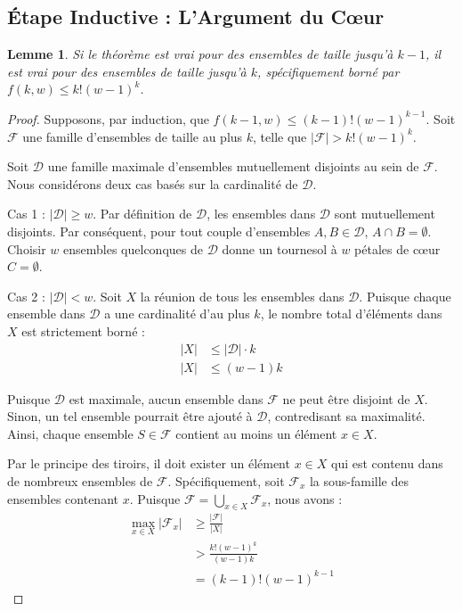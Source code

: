 \documentclass[12pt,a4paper]{article}
\newtheorem{lemma}[theorem]{Lemme}
\begin{document}
\subsection{\'Etape Inductive : L'Argument du C{\oe}ur}
\begin{lemma} \label{lem:inductive_step}
Si le th\'eor\`eme est vrai pour des ensembles de taille jusqu'\`a $k-1$, il est vrai pour des ensembles de taille jusqu'\`a $k$, sp\'ecifiquement born\'e par $f(k, w) \le k!(w-1)^k$.
\end{lemma}
\begin{proof}
Supposons, par induction, que $f(k-1, w) \le (k-1)!(w-1)^{k-1}$. Soit $\mathcal{F}$ une famille d'ensembles de taille au plus $k$, telle que $|\mathcal{F}| > k!(w-1)^k$.

Soit $\mathcal{D}$ une famille maximale d'ensembles mutuellement disjoints au sein de $\mathcal{F}$. Nous consid\'erons deux cas bas\'es sur la cardinalit\'e de $\mathcal{D}$.

Cas 1 : $|\mathcal{D}| \ge w$.
Par d\'efinition de $\mathcal{D}$, les ensembles dans $\mathcal{D}$ sont mutuellement disjoints. Par cons\'equent, pour tout couple d'ensembles $A, B \in \mathcal{D}$, $A \cap B = \emptyset$. Choisir $w$ ensembles quelconques de $\mathcal{D}$ donne un tournesol \`a $w$ p\'etales de c{\oe}ur $C = \emptyset$.

Cas 2 : $|\mathcal{D}| < w$.
Soit $X$ la r\'eunion de tous les ensembles dans $\mathcal{D}$. Puisque chaque ensemble dans $\mathcal{D}$ a une cardinalit\'e d'au plus $k$, le nombre total d'\'el\'ements dans $X$ est strictement born\'e :
\begin{align}
|X| &\le |\mathcal{D}| \cdot k \nonumber \\
|X| &\le (w - 1)k \label{eq:bound_x}
\end{align}

Puisque $\mathcal{D}$ est maximale, aucun ensemble dans $\mathcal{F}$ ne peut \^etre disjoint de $X$. Sinon, un tel ensemble pourrait \^etre ajout\'e \`a $\mathcal{D}$, contredisant sa maximalit\'e. Ainsi, chaque ensemble $S \in \mathcal{F}$ contient au moins un \'el\'ement $x \in X$.

Par le principe des tiroirs, il doit exister un \'el\'ement $x \in X$ qui est contenu dans de nombreux ensembles de $\mathcal{F}$. Sp\'ecifiquement, soit $\mathcal{F}_x$ la sous-famille des ensembles contenant $x$. Puisque $\mathcal{F} = \bigcup_{x \in X} \mathcal{F}_x$, nous avons :
\begin{align}
\max_{x \in X} |\mathcal{F}_x| &\ge \frac{|\mathcal{F}|}{|X|} \nonumber \\
&> \frac{k!(w-1)^k}{(w-1)k} \nonumber \\
&= (k-1)!(w-1)^{k-1}
\end{align}


\end{proof}
\end{document}

